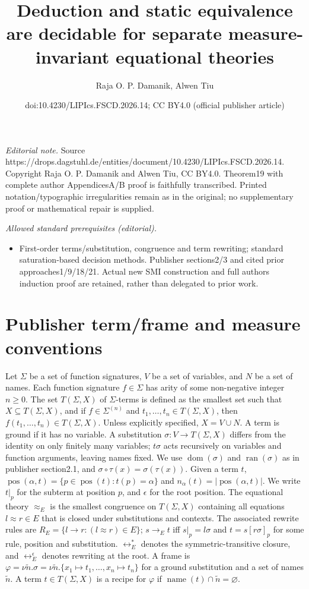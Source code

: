 \documentclass[10pt,a4paper]{amsart}
\title{Deduction and static equivalence are decidable for separate measure-invariant equational theories}
\author{Raja O. P. Damanik, Alwen Tiu}
\date{doi:10.4230/LIPIcs.FSCD.2026.14; CC BY4.0 (official publisher article)}
\begin{document}
\maketitle
\noindent\textit{Editorial note.} Source https://drops.dagstuhl.de/entities/document/10.4230/LIPIcs.FSCD.2026.14. Copyright Raja O. P. Damanik and Alwen Tiu, CC BY4.0. Theorem19 with complete author AppendicesA/B proof is faithfully transcribed. Printed notation/typographic irregularities remain as in the original; no supplementary proof or mathematical repair is supplied.\par\medskip
\noindent\textit{Allowed standard prerequisites (editorial).}\begin{itemize}
\item First-order terms/substitution, congruence and term rewriting; standard saturation-based decision methods. Publisher sections2/3 and cited prior approaches1/9/18/21. Actual new SMI construction and full authors induction proof are retained, rather than delegated to prior work.
\end{itemize}\medskip
\section*{Publisher term/frame and measure conventions}
Let $\Sigma$ be a set of function signatures, $V$ be a set of variables, and $N$ be a set of names. Each function signature $f\in\Sigma$ has arity of some non-negative integer $n\ge0$.
The set $T(\Sigma,X)$ of $\Sigma$-terms is defined as the smallest set such that $X\subseteq T(\Sigma,X)$, and if $f\in\Sigma^{(n)}$ and $t_1,\ldots,t_n\in T(\Sigma,X)$, then $f(t_1,\ldots,t_n)\in T(\Sigma,X)$. Unless explicitly specified, $X=V\cup N$.
A term is ground if it has no variable. A substitution $\sigma:V\to T(\Sigma,X)$ differs from the identity on only finitely many variables; $t\sigma$ acts recursively on variables and function arguments, leaving names fixed. We use $\operatorname{dom}(\sigma)$ and $\operatorname{ran}(\sigma)$ as in publisher section2.1, and $\sigma\circ\tau(x)=\sigma(\tau(x))$.
Given a term $t$, $\operatorname{pos}(\alpha,t)=\{p\in\operatorname{pos}(t):t(p)=\alpha\}$ and $n_\alpha(t)=|\operatorname{pos}(\alpha,t)|$. We write $t|_p$ for the subterm at position $p$, and $\epsilon$ for the root position.
The equational theory $\approx_E$ is the smallest congruence on $T(\Sigma,X)$ containing all equations $l\approx r\in E$ that is closed under substitutions and contexts. The associated rewrite rules are $R_E=\{l\to r:(l\approx r)\in E\}$; $s\to_E t$ iff $s|_p=l\sigma$ and $t=s[r\sigma]_p$ for some rule, position and substitution. $\leftrightarrow_E^*$ denotes the symmetric-transitive closure, and $\leftrightarrow_E^\epsilon$ denotes rewriting at the root.
A frame is $\varphi=\nu\tilde n.\sigma=\nu\tilde n.\{x_1\mapsto t_1,\ldots,x_n\mapsto t_n\}$ for a ground substitution and a set of names $\tilde n$.
A term $t\in T(\Sigma,X)$ is a recipe for $\varphi$ if $\operatorname{name}(t)\cap\tilde n=\varnothing$.
\end{document}

